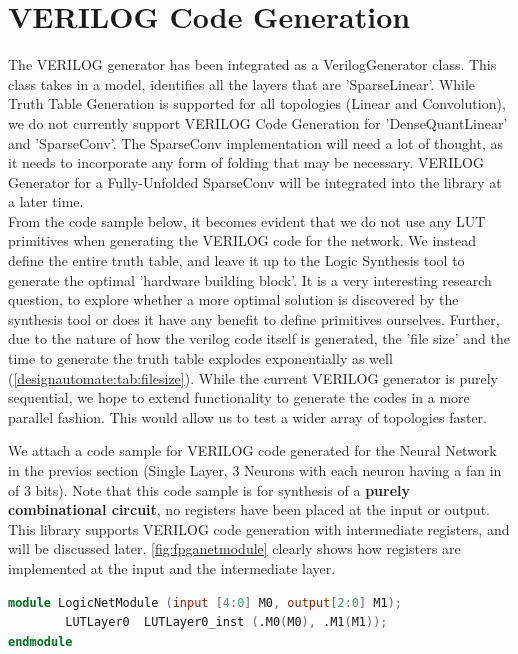 \section{VERILOG Code Generation}

The VERILOG generator has been integrated as a VerilogGenerator class. This class takes in a model, identifies all the layers that are 'SparseLinear'. While Truth Table Generation is supported for all topologies (Linear and Convolution), we do not currently support VERILOG Code Generation for 'DenseQuantLinear' and 'SparseConv'. The SparseConv implementation will need a lot of thought, as it needs to incorporate any form of folding that may be necessary. VERILOG Generator for a Fully-Unfolded SparseConv will be integrated into the library at a later time.\\
From the code sample below, it becomes evident that we do not use any LUT primitives when generating the VERILOG code for the network. We instead define the entire truth table, and leave it up to the Logic Synthesis tool to generate the optimal 'hardware building block'. It is a very interesting research question, to explore whether a more optimal solution is discovered by the synthesis tool or does it have any benefit to define primitives ourselves. 
Further, due to the nature of how the verilog code itself is generated, the 'file size' and the time to generate the truth table explodes exponentially as well (\cref{designautomate:tab:filesize}). While the current VERILOG generator is purely sequential, we hope to extend functionality to generate the codes in a more parallel fashion. This would allow us to test a wider array of topologies faster. 


We attach a code sample for VERILOG code generated for the Neural Network in the previos section (Single Layer, 3 Neurons with each neuron having a fan in of 3 bits). Note that this code sample is for synthesis of a \textbf{purely combinational circuit}, no registers have been placed at the input or output. This library supports VERILOG code generation with intermediate registers, and will be discussed later. \cref{fig:fpganetmodule} clearly shows how registers are implemented at the input and the intermediate layer.

\begin{lstlisting}[language=Verilog, caption=LogicNetModule.v, label=LogicNetModulev]
module LogicNetModule (input [4:0] M0, output[2:0] M1);
        LUTLayer0  LUTLayer0_inst (.M0(M0), .M1(M1));
endmodule
\end{lstlisting}

